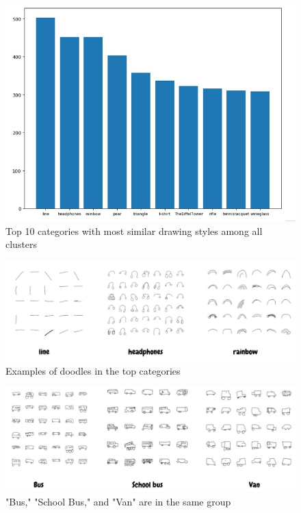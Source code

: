 \begin{figure}[ht]
\begin{center}
   \includegraphics[width=1\linewidth]{figures/top_category.jpg}
\end{center}
   \caption{Top 10 categories with most similar drawing styles among all clusters}
\label{fig:top_category}
\end{figure}


\begin{figure}[ht]
\begin{center}
   \includegraphics[width=1\linewidth]{figures/1.jpg}
\end{center}
   \caption{Examples of doodles in the top categories }
\label{fig:1}
\end{figure}


\begin{figure}[ht]
\begin{center}
   \includegraphics[width=1\linewidth]{figures/3.jpg}
\end{center}
   \caption{"Bus," "School Bus," and "Van" are in the same group}
\label{fig:3}
\end{figure}



